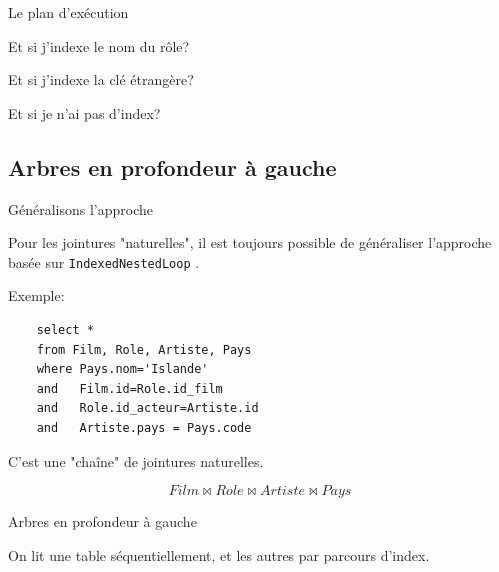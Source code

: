 \begin{frame}{Le plan d'exécution}


\end{frame}

\begin{frame}{Et si j'indexe le nom du rôle?}


\end{frame}

\begin{frame}{Et si j'indexe la clé étrangère?}


\end{frame}


\begin{frame}{Et si je n'ai pas d'index?}


\end{frame}

\subsection{Arbres en profondeur à gauche}

\begin{frame}[fragile]{Généralisons l'approche}

Pour les jointures "\alert{naturelles}", il est \alert{toujours} possible
de généraliser l'approche basée sur \texttt{IndexedNestedLoop} .

\vfill
Exemple:

\begin{verbatim}
    select *
    from Film, Role, Artiste, Pays
    where Pays.nom='Islande'
    and   Film.id=Role.id_film
    and   Role.id_acteur=Artiste.id
    and   Artiste.pays = Pays.code    
\end{verbatim}

\vfill

C'est une "chaîne" de jointures naturelles.

\[
   Film \Join Role \Join Artiste \Join Pays
\]
\end{frame}


\begin{frame}[fragile]{Arbres en profondeur à gauche}

On lit \alert{une} table \alert{séquentiellement}, et les autres par
\alert{parcours d'index}.

\vfill


\end{frame}

